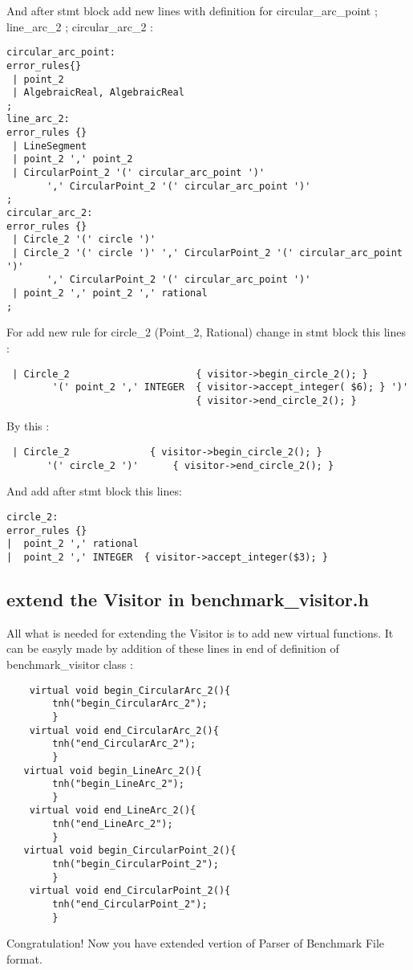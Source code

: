 \documentclass[10pt]{article}
\begin{document}
And after stmt block add new lines with definition for circular\_arc\_point ; line\_arc\_2 ; circular\_arc\_2 :

\begin{verbatim}
circular_arc_point:
error_rules{}
 | point_2
 | AlgebraicReal, AlgebraicReal
;
line_arc_2:
error_rules {}
 | LineSegment
 | point_2 ',' point_2 
 | CircularPoint_2 '(' circular_arc_point ')' 
       ',' CircularPoint_2 '(' circular_arc_point ')'
;
circular_arc_2:
error_rules {}
 | Circle_2 '(' circle ')'
 | Circle_2 '(' circle ')' ',' CircularPoint_2 '(' circular_arc_point ')' 
       ',' CircularPoint_2 '(' circular_arc_point ')'
 | point_2 ',' point_2 ',' rational
;
\end{verbatim}

For add new rule for circle\_2 (Point\_2, Rational) change in stmt block this lines :

\begin{verbatim}
 | Circle_2                      { visitor->begin_circle_2(); } 
        '(' point_2 ',' INTEGER  { visitor->accept_integer( $6); } ')' 
                                 { visitor->end_circle_2(); } 
\end{verbatim}

By this :

\begin{verbatim}
 | Circle_2      		 { visitor->begin_circle_2(); } 
       '(' circle_2 ')'   	 { visitor->end_circle_2(); } 
\end{verbatim}

And add after stmt block this lines:

\begin{verbatim}
circle_2:
error_rules {}
|  point_2 ',' rational  
|  point_2 ',' INTEGER  { visitor->accept_integer($3); } 
\end{verbatim}

\subsection{extend the Visitor in benchmark\_visitor.h}
All what is needed for extending the Visitor is to add new virtual functions. It can be easyly made by addition
 of these lines in end of definition of benchmark\_visitor class :

\begin{verbatim}
    virtual void begin_CircularArc_2(){
        tnh("begin_CircularArc_2");
        }
    virtual void end_CircularArc_2(){
        tnh("end_CircularArc_2");
        }
   virtual void begin_LineArc_2(){
        tnh("begin_LineArc_2");
        }
    virtual void end_LineArc_2(){
        tnh("end_LineArc_2");
        }
   virtual void begin_CircularPoint_2(){
        tnh("begin_CircularPoint_2");
        }
    virtual void end_CircularPoint_2(){
        tnh("end_CircularPoint_2");
        }
\end{verbatim}

Congratulation! Now you have extended vertion of Parser of Benchmark File format. 
\end{document}
